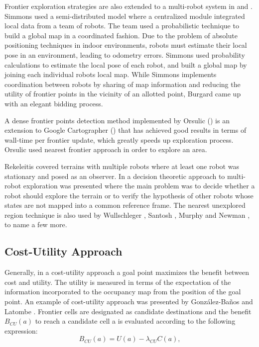 Frontier exploration strategies are also extended to a multi-robot system in \cite{Simmons2000} and \cite{Burgard2005}. Simmons \cite{Simmons2000} used a semi-distributed model where a centralized module integrated local data from a team of robots. The team used a probabilistic technique to build a global map in a coordinated fashion. Due to the problem of absolute positioning techniques in indoor environments, robots must estimate their local pose in an environment, leading to odometry errors. Simmons used probability calculations to estimate the local pose of each robot, and built a global map by joining each individual robots local map. 
While Simmons \cite{Simmons2000} implements coordination between robots by sharing of map information and reducing the utility of frontier points in the vicinity of an allotted point, Burgard \cite{Burgard2005} came up with an elegant bidding process. 

A dense frontier points detection method implemented by Orsulic (\cite{Orsulic2019}) is an extension to Google Cartographer (\cite{Hess2016}) that has achieved good results in terms of wall-time per frontier update, which greatly speeds up exploration process. Orsulic used nearest frontier approach in order to explore an area. 

Rekeleitis \cite{Rekeleitis2000} covered terrains with multiple robots where at least one robot was stationary and posed as an observer. In \cite{Fox2006} a decision theoretic approach to multi-robot exploration was presented where the main problem was to decide whether a robot should explore the terrain or to verify the hypothesis of other robots whose states are not mapped into a common reference frame. The nearest unexplored region technique is also used by Wullschleger \cite{Wullschleger99}, Santosh \cite{Santosh2008}, Murphy and Newman \cite{Murphy2008}, to name a few more.


\subsection{Cost-Utility Approach}

Generally, in a cost-utility approach a goal point maximizes the benefit between cost and utility. The utility is measured in terms of the expectation of the information incorporated to the occupancy map from the position of the goal point. An example of cost-utility approach was presented by González-Baños and Latombe \cite{GonzlezBaos2002}. Frontier cells are designated as candidate destinations and the benefit $B_{CU}(a)$ to reach a candidate cell a is evaluated according to the following expression:
\begin{equation}
B_{CU}(a) = U(a) - \lambda_{CU}C(a),
\label{equation:cost-utility}
\end{equation}

